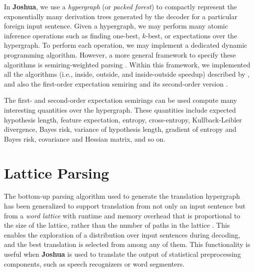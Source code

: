 \documentclass[11pt]{article}
\newcommand{\joshua}{\textbf{Joshua}\xspace}
\begin{document}
In \joshua, we use a {\em hypergraph} (or {\em packed forest}) to compactly 
represent the exponentially many derivation trees generated by the decoder for a 
particular foreign input sentence.
Given a hypergraph, we may perform many atomic inference operations
such as finding one-best, $k$-best, or expectations over the hypergraph.
To perform each operation, we may implement a dedicated dynamic programming algorithm.
However, a more general framework to specify these algorithms is semiring-weighted parsing \cite{semiringparsing}.
Within this framework, we implemented all the algorithms (i.e.,
inside, outside, and inside-outside speedup) described by ,
and also the first-order expectation semiring \cite{eisner-expectation-semiring} and its
second-order version \cite{li-eisner:2009:EMNLP}.


The first- and second-order expectation semirings can be used compute many interesting quantities over the hypergraph.
These quantities include expected hypothesis length, feature expectation, entropy, cross-entropy, Kullback-Leibler divergence,
Bayes risk, variance of hypothesis length, gradient of entropy and Bayes risk, covariance and Hessian matrix, and so on.


\section{Lattice Parsing}

The bottom-up parsing algorithm used to generate the translation hypergraph has been generalized to support translation from not only an input sentence but from a \emph{word lattice} with runtime and memory overhead that is proportional to the size of the lattice, rather than the number of paths in the lattice \cite{dyer-muresan-resnik:2008:ACLMain}.  This enables the exploration of a distribution over input sentences during decoding, and the best translation is selected from among any of them.  This functionality is useful when \joshua is used to translate the output of statistical preprocessing components, such as speech recognizers or word segmenters.
\end{document}
